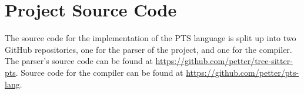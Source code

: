 \section{Project Source Code}\label{sec:project-source-code}

The source code for the implementation of the PTS language is split up into two GitHub repositories, one for the parser of the project, and one for the compiler.
The parser's source code can be found at \url{https://github.com/petter/tree-sitter-pts}.
Source code for the compiler can be found at \url{https://github.com/petter/pts-lang}.


%
%

